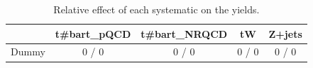 \documentclass[10pt]{article}
\begin{document}
\begin{table}[htbp]
\begin{center}
\begin{tabular}{|c|c|c|c|c|}
\hline 
      & t#bar{t}_{pQCD}      & t#bar{t}_{NRQCD}      & tW      & Z+jets \\ 
\hline 
  Dummy & 0 / 0 & 0 / 0 & 0 / 0 & 0 / 0 \\ 
\hline 
\end{tabular} 
\caption{Relative effect of each systematic on the yields.} 
\end{center} 
\end{table} 
\end{document}
